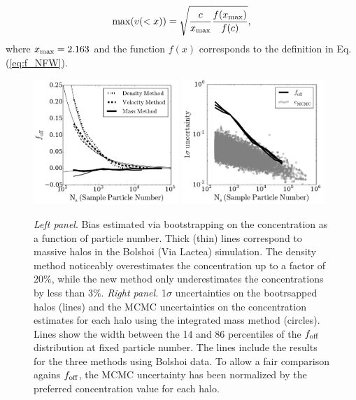 \documentclass{emulateapj}
\begin{document}
\begin{equation}
\mathrm{max}(v(<x)) = \sqrt{\frac{c}{x_{\rm max}}\frac{f(x_{\rm
      max})}{f(c)}},
\label{eq:max_v}
\end{equation}
where $x_{\rm max}=2.163$ \citep{Klypin2016} and the function $f(x)$
corresponds to the definition in Eq. (\ref{eq:f_NFW}).


\begin{figure}
\begin{center}
  \includegraphics[width=0.49\textwidth]{avg_foff_bolshoi.pdf}
  \includegraphics[width=0.48\textwidth]{sigma_foff_bolshoi.pdf}
\end{center}
\vspace{-0.5cm}
\caption{\emph{Left panel}. Bias estimated via bootstrapping on the
  concentration as a function of particle number.
  Thick (thin) lines correspond to massive halos in the Bolshoi (Via
  Lactea) simulation.
  The density method noticeably overestimates the concentration up to
  a factor of $20\%$, 
  while the new method only underestimates the concentrations by less
  than $3\%$.
  \emph{Right panel.}
  1$\sigma$ uncertainties on the bootrsapped halos (lines) and the MCMC
  uncertainties on the concentration estimates for each halo using the
  integrated mass method (circles).   
  Lines show the width between the 14 and 86 percentiles
  of the $f_{\rm off}$ distribution at fixed particle number. 
  The lines include the results for the three methods using Bolshoi data.
  To allow a fair comparison agains $f_{\rm off}$, the MCMC uncertainty has
  been normalized by the preferred concentration value for each halo. 
  \label{fig:downsampling}}
\end{figure}
\end{document}
